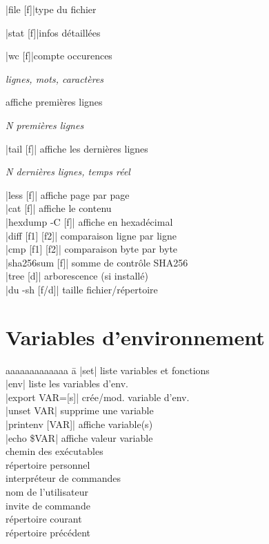 \documentclass{article}
\newenvironment{cmdblock}{%
  \par\setlength{\parindent}{0pt}\setlength{\parskip}{0pt}%
  \RaggedRight%
}{\par}
\newlength{\cmdoptindent}
\newcommand{\cmdopt}[1]{%
  \hspace*{\cmdoptindent}%
  \begin{minipage}[t]{\dimexpr\linewidth-\cmdoptindent\relax}
    \RaggedRight \itshape #1%
  \end{minipage}\par
}
\begin{document}
\begin{multicols}{4}
    \begin{cmdblock}
        \code|file [f]|\quad type du fichier\par
        \code|stat [f]|\quad infos détaillées\par
        \code|wc [f]|\quad compte occurences\par
        \cmdopt{ lignes,  mots,  caractères}
        \quad affiche premières lignes\par
        \cmdopt{ N premières lignes}
        \code|tail [f]| \quad affiche les dernières lignes \\
        \cmdopt{ N dernières lignes,
             temps réel}
        \code|less [f]| \quad affiche page par page \\
        \code|cat [f]| \quad affiche le contenu \\
        \code|hexdump -C [f]| \quad affiche en hexadécimal \\
        \code|diff [f1] [f2]| \quad comparaison ligne par ligne \\
        \code|cmp [f1] [f2]| \quad comparaison byte par byte \\
        \code|sha256sum [f]| \quad somme de contrôle SHA256 \\
        \code|tree [d]| \quad arborescence (si installé) \\
        \code|du -sh [f/d]| \quad taille fichier/répertoire \\
    \end{cmdblock}

    \section*{Variables d'environnement}
    \begin{tabbing}
        aaaaaaaaaaaaa \= a \kill
        \code|set| \> liste variables et fonctions \\
        \code|env| \> liste les variables d'env. \\
        \code|export VAR=[s]| \> crée/mod. variable d'env. \\
        \code|unset VAR| \> supprime une variable \\
        \code|printenv [VAR]| \> affiche variable(s) \\
        \code|echo \$VAR| \> affiche valeur variable \\
         \> chemin des exécutables \\
         \> répertoire personnel \\
         \> interpréteur de commandes \\
         \> nom de l'utilisateur \\
         \> invite de commande \\
         \> répertoire courant \\
         \> répertoire précédent \\
    \end{tabbing}


\end{multicols}
\end{document}
